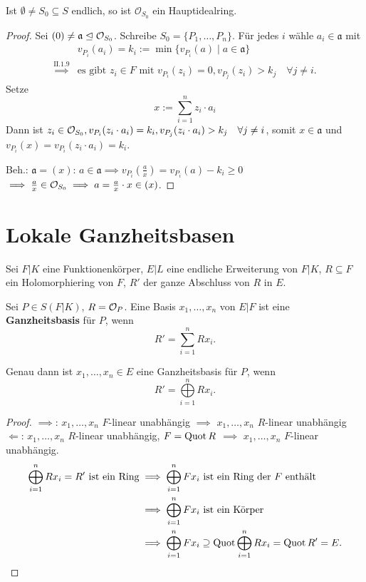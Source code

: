 \begin{satz}
    Ist $\emptyset \ne S_0 \subseteq S$ endlich, so ist $\mathcal{O}_{S_0}$ ein Hauptidealring.
\end{satz}
\begin{proof}
    Sei $(0) \ne \mathfrak{a} \trianglelefteq \mathcal{O}_{S_0}$. Schreibe $S_0 = \{P_1, \ldots, P_n\}$.
    Für jedes $i$ wähle $a_i \in \mathfrak{a}$ mit
    \begin{align*}
        & v_{P_i}(a_i) = k_i := \min \{v_{P_i}(a) \mid a \in \mathfrak{a}\}\\
        \stackrel{\text{II.1.9}}{\implies} & \text{es gibt } z_i \in F \text{ mit } v_{P_i}(z_i) = 0, v_{P_j}(z_i) > k_j \quad \forall j\ne i.
    \end{align*} 
    Setze $$x := \sum\limits_{i=1}^n z_i \cdot a_i$$
    Dann ist $z_i \in \mathcal{O}_{S_0}, v_{P_i}(z_i \cdot a_i) = k_i, v_{P_j}(z_i \cdot a_i) > k_j \quad \forall j \ne i$,
    somit $x \in \mathfrak{a}$ und $v_{P_i}(x) = v_{P_i}(z_i\cdot a_i) = k_i$.

    Beh.: $\mathfrak{a} = (x)$: $a \in \mathfrak{a} \implies v_{P_i}(\frac{a}{x}) = v_{P_i}(a) - k_i \geq 0$
    $\implies \frac{a}{x} \in \mathcal{O}_{S_0} \implies a = \frac{a}{x} \cdot x \in (x)$.
\end{proof}

\section{Lokale Ganzheitsbasen}
Sei $F|K$ eine Funktionenkörper, $E|L$ eine endliche Erweiterung von $F|K$, $R \subseteq F$ ein Holomorphiering von $F$,
$R'$ der ganze Abschluss von $R$ in $E$.

\begin{definition}
    Sei $P \in S(F|K)$, $R = \mathcal{O}_P$. Eine Basis $x_1, \ldots, x_n$ von $E|F$ ist eine \textbf{Ganzheitsbasis} für $P$, wenn
    $$ R' = \sum\limits_{i=1}^n R x_i. $$
\end{definition}

\begin{lemma}
    Genau dann ist $x_1,\ldots,x_n\in E$ eine Ganzheitsbasis für $P$, wenn $$R' = \bigoplus\limits_{i=1}^n R x_i.$$
\end{lemma}
\begin{proof}
    $\implies$: $x_1, \ldots, x_n$ $F$-linear unabhängig $\implies$ $x_1, \ldots, x_n$ $R$-linear unabhängig\\
    $\Longleftarrow$: $x_1,\ldots,x_n$ $R$-linear unabhängig, $F=\operatorname{Quot} R$ $\implies$ $x_1,\ldots,x_n$ $F$-linear unabhängig.
    \begin{align*}
        \bigoplus\limits_{i=1}^n Rx_i = R' \text{ ist ein Ring} & \implies \bigoplus\limits_{i=1}^n Fx_i \text{ ist ein Ring der }F \text{ enthält}\\
        & \implies \bigoplus\limits_{i=1}^n Fx_i \text{ ist ein Körper} \\
        & \implies \bigoplus\limits_{i=1}^n Fx_i \supseteq \operatorname{Quot} \bigoplus\limits_{i=1}^n Rx_i = \operatorname{Quot} R' = E.
    \end{align*}
\end{proof}


